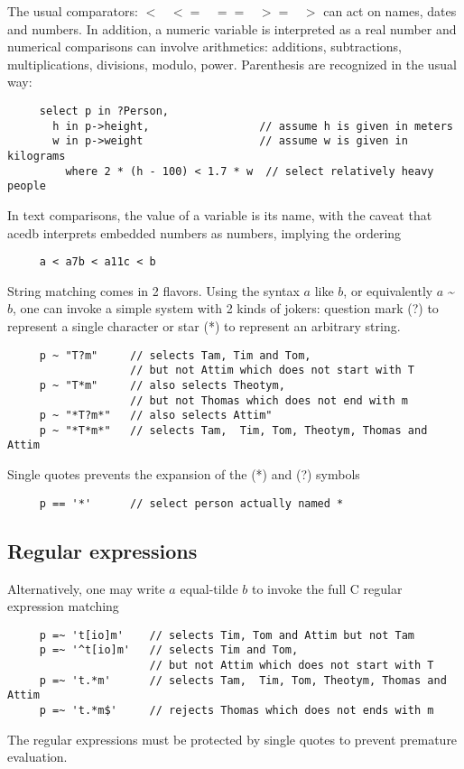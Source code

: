 \documentclass[11pt]{article}
\newcommand{\BL}{\begin{lstlisting}}
\begin{document}
The usual comparators: 
$< \;\;\; <= \;\;\;  ==  \;\;\; >=  \;\;\; >$
can act on names, dates and numbers. In addition, a numeric variable is interpreted as a real number  
and numerical comparisons can involve arithmetics: additions, subtractions, multiplications, divisions, 
modulo, power.  Parenthesis are recognized in the usual way:
\BL
     select p in ?Person, 
       h in p->height,                 // assume h is given in meters
       w in p->weight                  // assume w is given in kilograms
         where 2 * (h - 100) < 1.7 * w  // select relatively heavy people
\end{lstlisting}

In text comparisons, the value of a variable is its name, with the caveat that acedb interprets 
embedded numbers as numbers, implying the ordering
\BL
     a < a7b < a11c < b
\end{lstlisting}

String matching comes in 2 flavors. Using the syntax $a$ like $b$, or equivalently
$a$ \~{} $b$, one can invoke a simple system 
with 2 kinds of jokers: 
question mark (?) to represent a single character or star (*) to represent an arbitrary string. 
\BL
     p ~ "T?m"     // selects Tam, Tim and Tom, 
                   // but not Attim which does not start with T
     p ~ "T*m"     // also selects Theotym, 
                   // but not Thomas which does not end with m
     p ~ "*T?m*"   // also selects Attim"
     p ~ "*T*m*"   // selects Tam,  Tim, Tom, Theotym, Thomas and  Attim
\end{lstlisting}
Single quotes prevents the expansion of the (*) and (?) symbols
\BL
     p == '*'      // select person actually named *
\end{lstlisting}

\subsection{Regular expressions}
Alternatively, one may write $a$ equal-tilde $b$ to invoke the full C regular expression matching 
\BL
     p =~ 't[io]m'    // selects Tim, Tom and Attim but not Tam
     p =~ '^t[io]m'   // selects Tim and Tom, 
                      // but not Attim which does not start with T
     p =~ 't.*m'      // selects Tam,  Tim, Tom, Theotym, Thomas and  Attim
     p =~ 't.*m$'     // rejects Thomas which does not ends with m
\end{lstlisting}
The regular expressions must be protected by single quotes to prevent premature evaluation.
\end{document}
